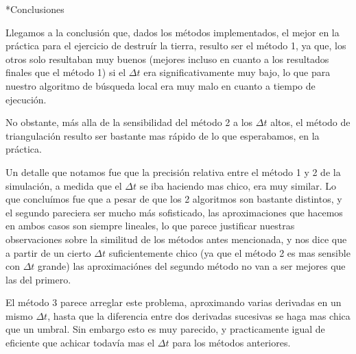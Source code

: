 \documentclass[12pt,titlepage]{article}
\begin{document}
	\begin{section}*{Conclusiones}	

		Llegamos a la conclusión que, dados los métodos implementados,
		el mejor en la práctica para el ejercicio de destruír la tierra, resulto ser el método 1, ya que,
		los otros solo resultaban muy buenos (mejores incluso en cuanto a los resultados finales que el método 1)
		si el $\Delta t$ era significativamente muy bajo,
		lo que para nuestro algoritmo de búsqueda local era muy malo en cuanto a tiempo de ejecución.

		No obstante, más alla de la sensibilidad del método 2 a los $\Delta t$ altos,
		el método de triangulación resulto ser bastante mas rápido de lo que esperabamos, en la práctica.

		Un detalle que notamos fue que la precisión relativa entre el método 1 y 2 de la simulación, a medida que el $\Delta t$ se iba haciendo mas chico,
		era muy similar. Lo que concluímos fue que a pesar de que los 2 algoritmos son bastante distintos,
		y el segundo pareciera ser mucho más sofisticado, las aproximaciones que hacemos en ambos casos son siempre lineales,
		lo que parece justificar nuestras observaciones sobre la similitud de los métodos antes mencionada,
		y nos dice que a partir de un cierto $\Delta t$ suficientemente chico (ya que el método 2 es mas sensible con $\Delta t$ grande) las aproximaciónes del segundo método
		no van a ser mejores que las del primero.

		El método 3 parece arreglar este problema, aproximando varias derivadas en un mismo $\Delta t$,
		hasta que la diferencia entre dos derivadas sucesivas se haga mas chica que un umbral.
		Sin embargo esto es muy parecido, y practicamente igual de eficiente que achicar todavía mas el $\Delta t$ para los métodos anteriores.
		

	\end{section}
	
\end{document}
